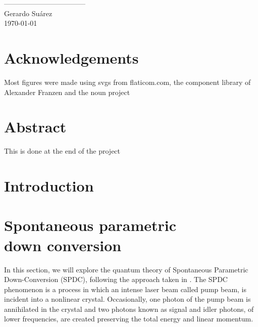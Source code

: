 \documentclass{book}
\newcommand\blankpage{
    \null
    \thispagestyle{empty}
    \addtocounter{page}{-1}
    \newpage
    }
\begin{document}
\vspace{2cm}
\begin{flushright}
-----------------------------------\\
Gerardo Suárez\\
\today
\end{flushright}
\pagebreak

\listoffigures\newpage
{}
\listoftables\newpage
\blankpage{}
\chapter*{Acknowledgements}
Most figures were made using svgs from flaticom.com, the component library of Alexander Franzen and the noun project

\pagebreak



\blankpage{}

\chapter*{Abstract}
This is done at the end of the project


\pagebreak


\blankpage{}

\chapter*{Introduction}


\blankpage{}


\chapter{Spontaneous parametric \\ down conversion}

In this section, we will explore the quantum theory of Spontaneous Parametric Down-Conversion (SPDC), following the approach taken in \cite{procopio,multiphoton}. The SPDC phenomenon is a process in which an intense laser beam called pump beam, is incident into a nonlinear crystal. Occasionally, one photon of the pump beam is annihilated in the crystal and two photons known as signal and idler photons, of lower frequencies, are created preserving the total energy and linear momentum.
\end{document}
